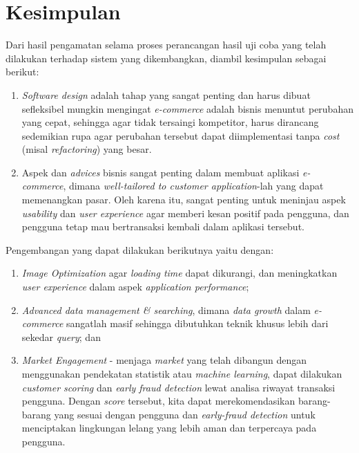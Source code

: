 
\section{Kesimpulan}
Dari hasil pengamatan selama proses perancangan hasil uji coba yang telah dilakukan terhadap sistem yang dikembangkan, diambil kesimpulan sebagai berikut:
\begin{enumerate}
	\item \textit{Software design} adalah tahap yang sangat penting dan harus dibuat sefleksibel mungkin mengingat \textit{e-commerce} adalah bisnis menuntut perubahan yang cepat, sehingga agar tidak tersaingi kompetitor, harus dirancang sedemikian rupa agar perubahan tersebut dapat diimplementasi tanpa \textit{cost} (misal \textit{refactoring}) yang besar.
	\item Aspek dan \textit{advices} bisnis sangat penting dalam membuat aplikasi \textit{e-commerce}, dimana \textit{well-tailored to customer application}-lah yang dapat memenangkan pasar. Oleh karena itu, sangat penting untuk meninjau aspek \textit{usability} dan \textit{user experience} agar memberi kesan positif pada pengguna, dan pengguna tetap mau bertransaksi kembali dalam aplikasi tersebut.
\end{enumerate}

Pengembangan yang dapat dilakukan berikutnya yaitu dengan:
\begin{enumerate}
	\item \textit{Image Optimization} agar \textit{loading time} dapat dikurangi, dan meningkatkan \textit{user experience} dalam aspek \textit{application performance};
	\item \textit{Advanced data management \& searching}, dimana \textit{data growth} dalam \textit{e-commerce} sangatlah masif sehingga dibutuhkan teknik khusus lebih dari sekedar \textit{query}; dan
	\item \textit{Market Engagement} - menjaga \textit{market} yang telah dibangun dengan menggunakan pendekatan statistik atau \textit{machine learning}, dapat dilakukan \textit{customer scoring} dan \textit{early fraud detection} lewat analisa riwayat transaksi pengguna. Dengan \textit{score} tersebut, kita dapat merekomendasikan barang-barang yang sesuai dengan pengguna dan \textit{early-fraud detection} untuk menciptakan lingkungan lelang yang lebih aman dan terpercaya pada pengguna.
\end{enumerate}